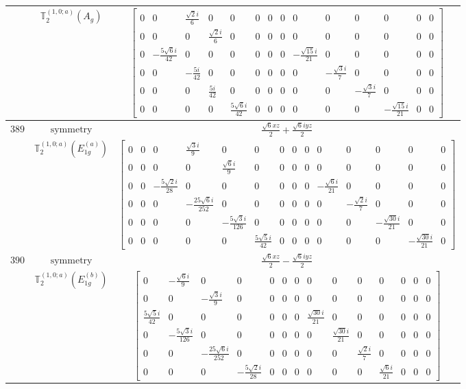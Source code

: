 \documentclass[fleqn,8pt,landscape]{jsarticle}
\begin{document}
\begin{longtable}{ccc}
$  $ & $ \mathbb{T}_{2}^{(1,0;a)}(A_{g}) $ & $ \begin{bmatrix} 0 & 0 & \frac{\sqrt{2} i}{6} & 0 & 0 & 0 & 0 & 0 & 0 & 0 & 0 & 0 & 0 & 0 \\ 0 & 0 & 0 & \frac{\sqrt{2} i}{6} & 0 & 0 & 0 & 0 & 0 & 0 & 0 & 0 & 0 & 0 \\ 0 & - \frac{5 \sqrt{6} i}{42} & 0 & 0 & 0 & 0 & 0 & 0 & - \frac{\sqrt{15} i}{21} & 0 & 0 & 0 & 0 & 0 \\ 0 & 0 & - \frac{5 i}{42} & 0 & 0 & 0 & 0 & 0 & 0 & - \frac{\sqrt{3} i}{7} & 0 & 0 & 0 & 0 \\ 0 & 0 & 0 & \frac{5 i}{42} & 0 & 0 & 0 & 0 & 0 & 0 & - \frac{\sqrt{3} i}{7} & 0 & 0 & 0 \\ 0 & 0 & 0 & 0 & \frac{5 \sqrt{6} i}{42} & 0 & 0 & 0 & 0 & 0 & 0 & - \frac{\sqrt{15} i}{21} & 0 & 0 \end{bmatrix} $ \\ \hline
$ 389 $ & $ \text{symmetry} $ & $ \frac{\sqrt{6} x z}{2} + \frac{\sqrt{6} i y z}{2} $ \\
$  $ & $ \mathbb{T}_{2}^{(1,0;a)}(E_{1g}^{(a)}) $ & $ \begin{bmatrix} 0 & 0 & 0 & \frac{\sqrt{3} i}{9} & 0 & 0 & 0 & 0 & 0 & 0 & 0 & 0 & 0 & 0 \\ 0 & 0 & 0 & 0 & \frac{\sqrt{6} i}{9} & 0 & 0 & 0 & 0 & 0 & 0 & 0 & 0 & 0 \\ 0 & 0 & - \frac{5 \sqrt{2} i}{28} & 0 & 0 & 0 & 0 & 0 & 0 & - \frac{\sqrt{6} i}{21} & 0 & 0 & 0 & 0 \\ 0 & 0 & 0 & - \frac{25 \sqrt{6} i}{252} & 0 & 0 & 0 & 0 & 0 & 0 & - \frac{\sqrt{2} i}{7} & 0 & 0 & 0 \\ 0 & 0 & 0 & 0 & - \frac{5 \sqrt{3} i}{126} & 0 & 0 & 0 & 0 & 0 & 0 & - \frac{\sqrt{30} i}{21} & 0 & 0 \\ 0 & 0 & 0 & 0 & 0 & \frac{5 \sqrt{5} i}{42} & 0 & 0 & 0 & 0 & 0 & 0 & - \frac{\sqrt{30} i}{21} & 0 \end{bmatrix} $ \\ \hline
$ 390 $ & $ \text{symmetry} $ & $ \frac{\sqrt{6} x z}{2} - \frac{\sqrt{6} i y z}{2} $ \\
$  $ & $ \mathbb{T}_{2}^{(1,0;a)}(E_{1g}^{(b)}) $ & $ \begin{bmatrix} 0 & - \frac{\sqrt{6} i}{9} & 0 & 0 & 0 & 0 & 0 & 0 & 0 & 0 & 0 & 0 & 0 & 0 \\ 0 & 0 & - \frac{\sqrt{3} i}{9} & 0 & 0 & 0 & 0 & 0 & 0 & 0 & 0 & 0 & 0 & 0 \\ \frac{5 \sqrt{5} i}{42} & 0 & 0 & 0 & 0 & 0 & 0 & \frac{\sqrt{30} i}{21} & 0 & 0 & 0 & 0 & 0 & 0 \\ 0 & - \frac{5 \sqrt{3} i}{126} & 0 & 0 & 0 & 0 & 0 & 0 & \frac{\sqrt{30} i}{21} & 0 & 0 & 0 & 0 & 0 \\ 0 & 0 & - \frac{25 \sqrt{6} i}{252} & 0 & 0 & 0 & 0 & 0 & 0 & \frac{\sqrt{2} i}{7} & 0 & 0 & 0 & 0 \\ 0 & 0 & 0 & - \frac{5 \sqrt{2} i}{28} & 0 & 0 & 0 & 0 & 0 & 0 & \frac{\sqrt{6} i}{21} & 0 & 0 & 0 \end{bmatrix} $ \\ \hline

\end{longtable}
\end{document}
